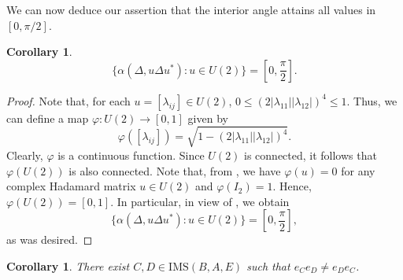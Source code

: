 \documentclass[a4]{amsart}
\newtheorem{corollary}[theorem]{\bf Corollary}
\numberwithin{equation}{section}
\begin{document}
We can now deduce our assertion that the interior angle attains all
values in $[0, \pi/2]$.
\begin{corollary} 
  \[
  \{\alpha(\Delta,u\Delta u^*): u \in U(2)\} = \left[0, \frac{\pi}{2}\right].
  \]
\end{corollary}
\begin{proof}
Note that, for each $u=[\lambda_{ij}]\in U(2)$,
$0 \leq (2|\lambda_{11}||\lambda_{12}|)^4 \leq 1$. Thus, we can define a
map $\varphi : U(2) \to [0,1]$ given by
\[
		\varphi \left([\lambda_{ij}]\right) =
                \sqrt{1-(2|\lambda_{11}||\lambda_{12}|)^4}.
\]
Clearly, $\varphi$ is a continuous function. Since $U(2)$ is
connected, it follows that $\varphi(U(2))$ is also connected. Note
that, from , we have $\varphi(u)= 0$ for any complex
Hadamard matrix $u\in U(2)$ and $\varphi(I_2)=1$. Hence, $ \varphi(U(2)) =
[0,1] $. In particular, in view of , we obtain
\[
  \{\alpha(\Delta,u\Delta u^*): u \in U(2)\} = \left[0,\frac{\pi}{2}\right],
  \]
as was desired.	\end{proof}

\begin{corollary}
  There exist $C, D \in \mathrm{IMS}(B, A, E)$ such that $e_C
  e_D \neq e_D e_C$.
\end{corollary}
\end{document}
